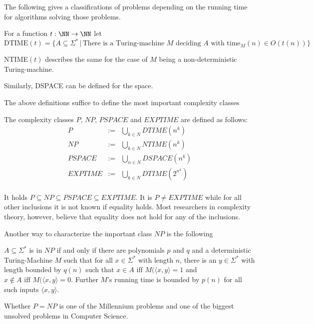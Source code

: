       The following gives a classifications of problems depending on the
      running time for algorithms solving those problems.
		\begin{definition}
			For a function $t: \NN \to \NN$ let 
      $$ \text{DTIME}(t) = \{ A \subseteq \Sigma^* \,|\, \text{There is a
      Turing-machine } M \text{ deciding } A \text{ with time}_M(n) \in O(t(n)) \} $$

      NTIME$(t)$ describes the same for the case of $M$ being a
      non-deterministic Turing-machine.

      Similarly, DSPACE can be defined for the space.
		\end{definition}
		The above definitions suffice to define the most important complexity classes
		\begin{definition}
			The complexity classes $P$, $NP$, $PSPACE$ and $EXPTIME$ are defined as follows:
			\begin{eqnarray*}
				P & := & \bigcup_{k \in N} DTIME(n^k) \\
				NP & := & \bigcup_{k \in N} NTIME(n^k) \\
				PSPACE & := & \bigcup_{n \in N} DSPACE(n^k) \\
				EXPTIME & := & \bigcup_{k \in N} DTIME(2^{n^k}) \\
			\end{eqnarray*}
		\end{definition}
		It holds $P \subseteq NP \subseteq PSPACE \subseteq EXPTIME$. 
		It is $P \neq EXPTIME$ while for all other inclusions it is not known if equality holds.
    Most researchers in complexity theory, however, believe that equality does
    not hold for any of the inclusions.

    Another way to characterize the important class $NP$ is the following
    \begin{theorem}
      $A \subseteq \Sigma^*$ is in $NP$ if and only if there are polynomials
      $p$ and $q$ and a deterministic Turing-Machine $M$ such that for all $x
      \in \Sigma^*$ with length $n$, there is an $y \in \Sigma^*$ with length
      bounded by $q(n)$ such that $x \in A \text{ iff } M(\langle x,y \rangle = 1$ and 
      $x \not \in A \text{ iff } M(\langle x,y \rangle = 0$. 
      Further $M$'s running time is bounded by $p(n)$ for all such inputs
      $\langle x,y \rangle$.
    \end{theorem}
		Whether $P = NP$ is one of the Millennium problems and one of the biggest unsolved problems in Computer Science.

